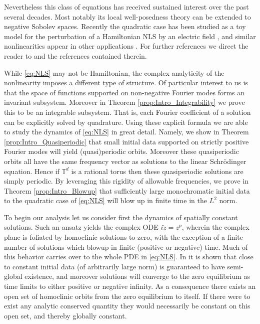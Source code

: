 \documentclass{article}
\newcommand{\T}{\mathbb{T}}
\begin{document}
Nevertheless this class of equations has received sustained interest over the past several decades.
Most notably its local well-posedness theory can be extended to negative Sobolev spaces\cite{kenig1996quadratic,bejenaru2006sharp}. 
Recently the quadratic case has been studied as a toy model for the perturbation of a Hamiltonian NLS by an electric field \cite{leger2018global}, and similar nonlinearities appear in other applications  \cite{gustafson2006scattering,colin2009stability,hayashi2013system}.  
For further references we direct the reader to \cite{kishimoto2019remark,jaquette2020global} and the references contained therein. 



While \eqref{eq:NLS} may not be Hamiltonian, the complex analyticity of the  nonlinearity imposes a different type of structure.  
Of particular interest to us is that the space of functions supported on non-negative Fourier modes forms an invariant subsystem. 
Moreover in Theorem \ref{prop:Intro_Integrability} we prove this to be an integrable subsystem. 
That is, each Fourier coefficient of a solution can be explicitly solved by quadrature. 
Using these explicit formula we are able to study the dynamics of \eqref{eq:NLS} in great detail. 
Namely,  we show in Theorem \ref{prop:Intro_Quasiperiodic} that small initial data supported on strictly positive Fourier modes will yield (quasi)periodic orbits. 
Moreover these quasiperiodic orbits all have the same frequency vector as solutions to the linear Schr\"odinger equation. 
Hence if $\T^d$ is a rational torus then these quasiperiodic solutions are simply periodic. 
By leveraging this rigidity of allowable frequencies, we prove in Theorem \ref{prop:Intro_Blowup} that sufficiently large monochromatic initial data to the quadratic case of \eqref{eq:NLS} will blow up in finite time in the $L^2$ norm. 



To begin our analysis let us consider first the dynamics of spatially constant solutions. 
Such an ansatz yields the complex ODE $i \dot{z} = z^p$, wherein the complex plane is foliated by homoclinic solutions to zero, with the exception of a finite number of solutions which blowup in finite (positive or negative) time. 
Much of this behavior carries over to the whole PDE in \eqref{eq:NLS}. In \cite{jaquette2020global} it is shown that close to constant initial data (of arbitrarily large norm) is guaranteed to have semi-global existence, and moreover solutions will converge to the zero equilibrium  as time limits to either positive or negative infinity. As a consequence there exists an open set of homoclinic orbits from the zero equilibrium to itself.  
If there were to exist any analytic conserved quantity they would necessarily be constant on this open set, and thereby globally constant.
\end{document}
